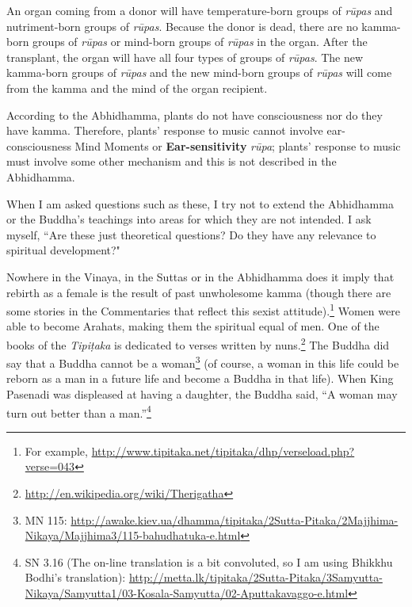 
An organ coming from a donor will have temperature-born groups of \textit{rūpas} and nutriment-born groups of \textit{rūpas}. Because the donor is dead, there are no kamma-born groups of \textit{rūpas} or mind-born groups of \textit{rūpas} in the organ. After the transplant, the organ will have all four types of groups of \textit{rūpas}. The new kamma-born groups of \textit{rūpas} and the new mind-born groups of \textit{rūpas} will come from the kamma and the mind of the organ recipient.

\pagebreak


According to the Abhidhamma, plants do not have consciousness nor do they have kamma. Therefore, plants' response to music cannot involve ear-consciousness Mind Moments or \textbf{Ear-sensitivity} \textit{rūpa}; plants' response to music must involve some other mechanism and this is not described in the Abhidhamma.

When I am asked questions such as these, I try not to extend the Abhidhamma or the Buddha's teachings into areas for which they are not intended. I ask myself, ``Are these just theoretical questions? Do they have any relevance to spiritual development?"


Nowhere in the Vinaya, in the Suttas or in the Abhidhamma does it imply that rebirth as a female is the result of past unwholesome kamma (though there are some stories in the Commentaries that reflect this sexist attitude).\footnote{For example, \url{http://www.tipitaka.net/tipitaka/dhp/verseload.php?verse=043}} Women were able to become Arahats, making them the spiritual equal of men. One of the books of the \textit{Tipiṭaka} is dedicated to verses written by nuns.\footnote{\url{http://en.wikipedia.org/wiki/Therigatha}} The Buddha did say that a Buddha cannot be a woman\footnote{MN 115: \url{http://awake.kiev.ua/dhamma/tipitaka/2Sutta-Pitaka/2Majjhima-Nikaya/Majjhima3/115-bahudhatuka-e.html}} (of course, a woman in this life could be reborn as a man in a future life and become a Buddha in that life). When King Pasenadi was displeased at having a daughter, the Buddha said, “A woman may turn out better than a man.”\footnote{SN 3.16 (The on-line translation is a bit convoluted, so I am using Bhikkhu Bodhi’s translation): \url{http://metta.lk/tipitaka/2Sutta-Pitaka/3Samyutta-Nikaya/Samyutta1/03-Kosala-Samyutta/02-Aputtakavaggo-e.html}}

